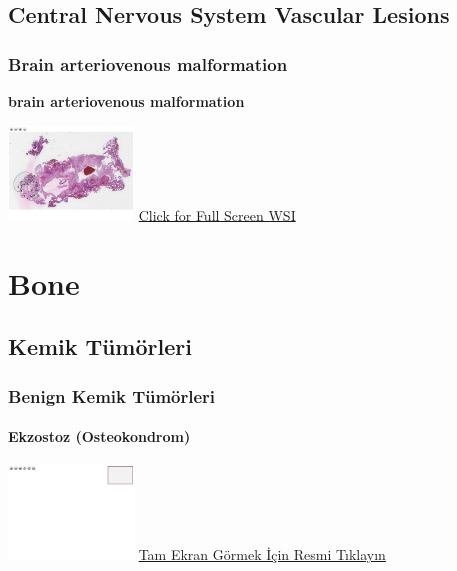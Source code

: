 \documentclass[
  letterpaper,
  paper=6in:9in,
  pagesize=pdftex,
  headinclude=on,
  footinclude=on,
  12pt]{scrbook}
\begin{document}
\hypertarget{sec-central-nervous-system-vascular}{%
\chapter{Central Nervous System Vascular
Lesions}\label{sec-central-nervous-system-vascular}}

\hypertarget{sec-brain-arteriovenous-malformation}{%
\section{Brain arteriovenous
malformation}\label{sec-brain-arteriovenous-malformation}}

\textbf{brain arteriovenous malformation}

\href{https://images.patolojiatlasi.com/brain-arteriovenous-malformation/HE.html}{\includegraphics[width=0.25\textwidth,height=\textheight]{./screenshots/brain-arteriovenous-malformation_screenshot.png}}
\href{https://images.patolojiatlasi.com/brain-arteriovenous-malformation/HE.html}{Click
for Full Screen WSI}

\part{Bone}

\hypertarget{sec-kemik-tumorleri}{%
\chapter{Kemik Tümörleri}\label{sec-kemik-tumorleri}}

\hypertarget{sec-benign-kemik-tumorleri}{%
\section{Benign Kemik Tümörleri}\label{sec-benign-kemik-tumorleri}}

\hypertarget{sec-ekzostoz}{%
\subsection{Ekzostoz (Osteokondrom)}\label{sec-ekzostoz}}

\href{https://images.patolojiatlasi.com/template/HE.html}{\includegraphics[width=0.25\textwidth,height=\textheight]{./screenshots/template_screenshot.png}}
\href{https://images.patolojiatlasi.com/exostosis/oc.html}{Tam Ekran
Görmek İçin Resmi Tıklayın}
\end{document}
